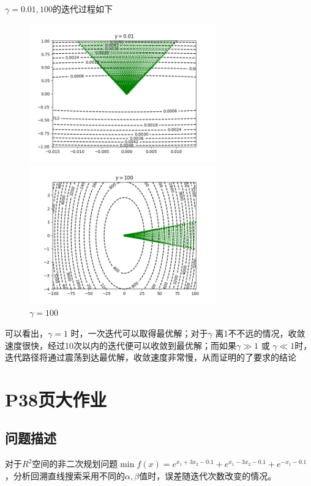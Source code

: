 \documentclass{article}
\begin{document}
$\gamma=0.01,100$的迭代过程如下
\begin{figure}[htbp]
    \centering
    \begin{minipage}[t]{0.48\textwidth}
        \centering
        \includegraphics[width=8cm]{Fig/3-34_0.01.png}
        \caption{$\gamma=0.01$}
    \end{minipage}
    \begin{minipage}[t]{0.48\textwidth}
        \centering
        \includegraphics[width=8cm]{Fig/3-34_100.png}
        \caption{$\gamma=100$}
    \end{minipage}
\end{figure}

可以看出，$\gamma =1$ 时，一次迭代可以取得最优解；对于$\gamma$ 离1不不远的情况，收敛速度很快，经过10次以内的迭代便可以收敛到最优解；而如果$\gamma \gg 1$ 或 $\gamma \ll 1$时，迭代路径将通过震荡到达最优解，收敛速度非常慢，从而证明的了要求的结论

\section{P38页大作业}

\subsection{问题描述}
对于$R^2$空间的非二次规划问题$\min f(x)=e^{x_1+3x_2-0.1}+e^{x_1-3x_2-0.1}+e^{-x_1-0.1}$，分析回溯直线搜索采用不同的$\alpha,\beta$值时，误差随迭代次数改变的情况。
\end{document}
